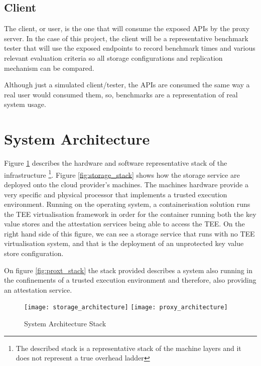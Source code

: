 \subsection{Client}
\label{ssec:client}

The client, or user, is the one that will consume the exposed \glspl{API} by the proxy server. In the case of this project, the client will be a representative benchmark tester that will use the exposed endpoints to record benchmark times and various relevant evaluation criteria so all storage configurations and replication mechanism can be compared.

Although just a simulated client/tester, the \glspl{API} are consumed the same way a real user would consumed them, so, benchmarks are a representation of real system usage.

\section{System Architecture}
\label{sec:system_architecture}

Figure \ref{fig:system_architecture_stack} describes the hardware and software representative stack of the infrastructure \footnote{The described stack is a representative stack of the machine layers and it does not represent a true overhead ladder}. Figure \ref{fig:storage_stack} shows how the storage service are deployed onto the cloud provider's machines. The machines hardware provide a very specific and physical processor that implements a trusted execution environment. Running on the operating system, a containerisation solution runs the \gls{TEE} virtualisation framework in order for the container running both the key value stores and the attestation services being able to access the \gls{TEE}. On the right hand side of this figure, we can see a storage service that runs with no \gls{TEE} virtualisation system, and that is the deployment of an unprotected key value store configuration.

On figure \ref{fig:proxt_stack} the stack provided describes a system also running in the confinements of a trusted execution environment and therefore, also providing an attestation service.

\begin{figure}[htbp]
  \centering
    {\texttt{[image: storage\_architecture]}}%
    \hspace{5em}
    {\texttt{[image: proxy\_architecture]}}%
  \caption{System Architecture Stack}
  \label{fig:system_architecture_stack}
\end{figure}

